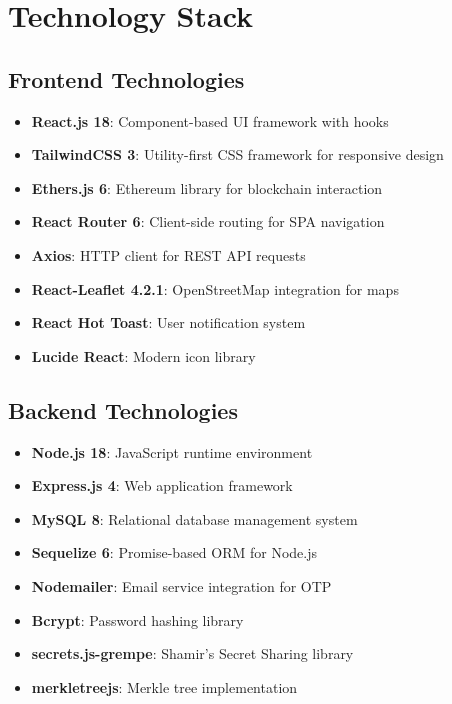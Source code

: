 \section{Technology Stack}

\subsection{Frontend Technologies}

\begin{itemize}
    \item \textbf{React.js 18}: Component-based UI framework with hooks
    \item \textbf{TailwindCSS 3}: Utility-first CSS framework for responsive design
    \item \textbf{Ethers.js 6}: Ethereum library for blockchain interaction
    \item \textbf{React Router 6}: Client-side routing for SPA navigation
    \item \textbf{Axios}: HTTP client for REST API requests
    \item \textbf{React-Leaflet 4.2.1}: OpenStreetMap integration for maps
    \item \textbf{React Hot Toast}: User notification system
    \item \textbf{Lucide React}: Modern icon library
\end{itemize}

\subsection{Backend Technologies}

\begin{itemize}
    \item \textbf{Node.js 18}: JavaScript runtime environment
    \item \textbf{Express.js 4}: Web application framework
    \item \textbf{MySQL 8}: Relational database management system
    \item \textbf{Sequelize 6}: Promise-based ORM for Node.js
    \item \textbf{Nodemailer}: Email service integration for OTP
    \item \textbf{Bcrypt}: Password hashing library
    \item \textbf{secrets.js-grempe}: Shamir's Secret Sharing library
    \item \textbf{merkletreejs}: Merkle tree implementation
\end{itemize}

